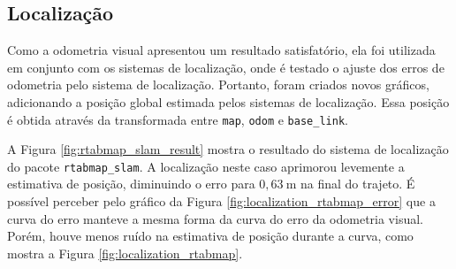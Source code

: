 \documentclass[repeatfields,xlists,xpacks,oneside,yearsonly]{ufrgscca}
\begin{document}
\subsection{Localização}

Como a odometria visual apresentou um resultado satisfatório, ela foi
utilizada em conjunto com os sistemas de localização, onde é testado
o ajuste dos erros de odometria pelo sistema de localização.
Portanto, foram criados novos gráficos, adicionando a posição global
estimada pelos sistemas de localização. Essa posição é obtida através
da transformada entre \texttt{map}, \texttt{odom} e
\texttt{base\_link}.

A Figura \ref{fig:rtabmap_slam_result} mostra o resultado do sistema
de localização do pacote \texttt{rtabmap\_slam}. A localização neste
caso aprimorou levemente a estimativa de posição, diminuindo o erro
para $0,63~\si{\meter}$ na final do trajeto. É possível perceber pelo
gráfico da Figura \ref{fig:localization_rtabmap_error} que a curva do
erro manteve a mesma forma da curva do erro da odometria visual.
Porém, houve menos ruído na estimativa de posição durante a curva,
como mostra a Figura \ref{fig:localization_rtabmap}.
\end{document}

